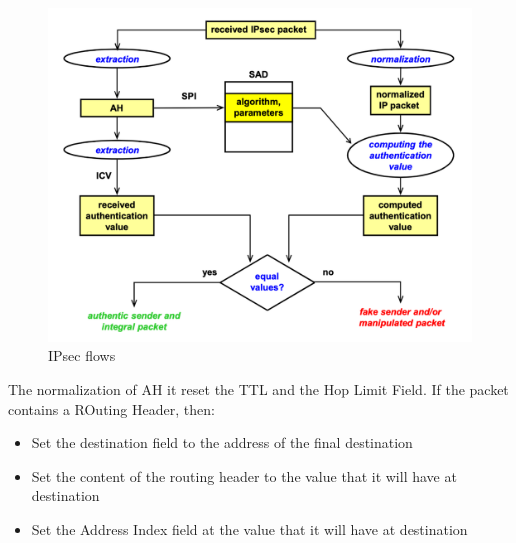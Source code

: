 \documentclass[12pt]{article}
\begin{document}
\begin{figure}[H]
   \centering
   \includegraphics[width=\linewidth]{images/ipssec_flow.png}
   \caption{IPsec flows}
   \label{fig:ipssec_flow}
\end{figure}
The normalization of AH it reset the TTL and the Hop Limit Field. If the packet contains a ROuting Header, then:
\begin{itemize}
  \item Set the destination field to the address of the final destination
  \item Set the content of the routing header to the value that it will have at destination
  \item Set the Address Index field at the value that it will have at destination
\end{itemize}
\end{document}
